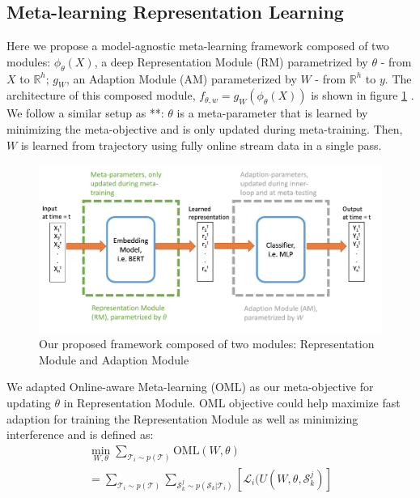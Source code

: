 \subsection{Meta-learning Representation Learning}
\label{sec:mlr}
Here we propose a model-agnostic meta-learning framework composed of two modules: $\phi_\theta(X)$, a deep Representation Module (RM) parametrized by $\theta$ - from $X$ to $\mathbb{R} ^ {h}$; $g_W$, an Adaption Module (AM) parameterized by $W$ - from $\mathbb{R} ^ {h}$ to $y$. The architecture of this composed module, $f_{\theta, w} = g_W(\phi_\theta(X))$ is shown in figure \ref{img:1} . We follow a similar setup as **: $\theta$ is a meta-parameter that is learned by minimizing the meta-objective and is only updated during meta-training. Then, $W$ is learned from trajectory using fully online stream data in a single pass.

\begin{figure}[ht]
\centering
    \includegraphics[scale=0.6]{imgs/framework.jpg}
    \caption{Our proposed framework composed of two modules: Representation Module and Adaption Module}
    \label{img:1}
\end{figure}

We adapted Online-aware Meta-learning (OML) as our meta-objective for updating $\theta$ in Representation Module. OML objective could help maximize fast adaption for training the Representation Module as well as minimizing interference and is defined as:
\begin{equation}
    \begin{aligned}
       \min_{W, \theta} \sum_{\mathcal{T}_i \sim p(\mathcal{T})} \mathrm{OML}(W, \theta) \\
       = \sum_{\mathcal{T}_i \sim p(\mathcal{T})} \sum_{\mathcal{S}_k ^ j \sim p(\mathcal{S}_k | \mathcal{T}_i)} [\mathcal{L}_i (U(W, \theta, \mathcal{S}_k ^ j)]
   \end{aligned}
\end{equation}

